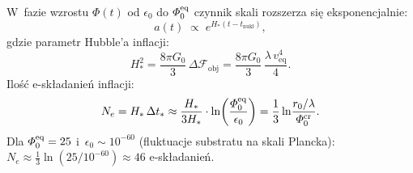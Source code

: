 \begin{proposition}\label{prop:inflation-TGP}
W~fazie wzrostu $\Phi(t)$ od $\epsilon_0$ do $\varPhi_0^{\mathrm{eq}}$
czynnik skali rozszerza si\k{e} eksponencjalnie:
\begin{equation}\label{eq:scale-factor-inflation}
    a(t) \;\propto\; e^{H_* (t - t_\mathrm{nukl})},
\end{equation}
gdzie parametr Hubble'a inflacji:
\begin{equation}\label{eq:H-inflation-TGP}
    H_*^2
    = \frac{8\pi G_0}{3}\,\Delta\mathcal{F}_\mathrm{obj}
    = \frac{8\pi G_0}{3}\,\frac{\lambda\,v_{\mathrm{eq}}^4}{4}.
\end{equation}
Ilo\'s\'c e-sk\l{}adanie\'n inflacji:
\begin{equation}\label{eq:N-efolds}
    N_e = H_*\,\Delta t_*
    \approx \frac{H_*}{3H_*}
    \cdot \ln\!\left(\frac{\varPhi_0^{\mathrm{eq}}}{\epsilon_0}\right)
    = \frac{1}{3}\ln\!\frac{r_0/\lambda}{\varPhi_0^{\mathrm{cr}}}.
\end{equation}
Dla $\varPhi_0^{\mathrm{eq}} = 25$ i~$\epsilon_0 \sim 10^{-60}$
(fluktuacje substratu na skali Plancka):
$N_e \approx \tfrac{1}{3}\ln(25/10^{-60}) \approx 46$ e-sk\l{}adanie\'n.
\end{proposition}

